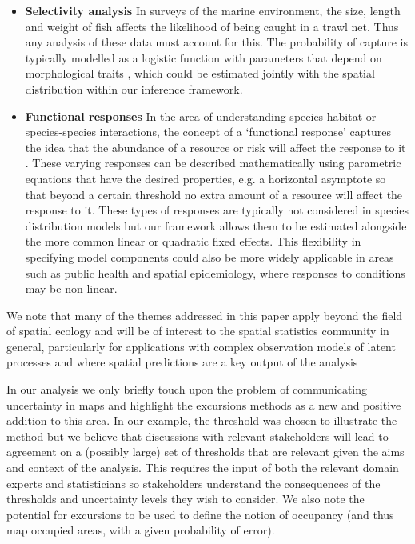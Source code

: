 \documentclass{stylefile16/statsoc}
\begin{document}
\begin{itemize}
	\item \textbf{Selectivity analysis} In surveys of the marine environment, the size, length and weight of fish affects the likelihood of being caught in a trawl net.  Thus any analysis of these data must account for this.  The probability of capture is typically modelled as a logistic function with parameters that depend on morphological traits \citep{herrmann_understanding_2016, madsen_selectivity_2007, galbraith_demersal_1994}, which could be estimated jointly with the spatial distribution within our inference framework.
	\item \textbf{Functional responses} In the area of understanding species-habitat or species-species interactions, the concept of a `functional response' captures the idea that the abundance of a resource or risk will affect the response to it \citep{holling_some_1959}.  These varying responses can be described mathematically using parametric equations that have the desired properties, e.g. a horizontal asymptote so that beyond a certain threshold no extra amount of a resource will affect the response to it.  These types of responses are typically not considered in species distribution models but our framework allows them to be estimated alongside the more common linear or quadratic fixed effects. This flexibility in specifying model components could also be more widely applicable in areas such as public health and spatial epidemiology, where responses to conditions may be non-linear.

\end{itemize}
We note that many of the themes addressed in this paper apply beyond the field of spatial ecology and will be of interest to the spatial statistics community in general, particularly for applications with complex observation models of latent processes and where spatial predictions are a key output of the analysis

In our analysis we only briefly touch upon the problem of communicating uncertainty in maps and highlight the excursions methods as a new and positive addition to this area.  In our example, the threshold was chosen to illustrate the method but we believe that discussions with relevant stakeholders will lead to agreement on a (possibly large) set of thresholds that are relevant given the aims and context of the analysis.  This requires the input of both the relevant domain experts and statisticians so stakeholders understand the consequences of the thresholds and uncertainty levels they wish to consider.  We also note the potential for excursions to be used to define the notion of occupancy (and thus map occupied areas, with a given probability of error).
\end{document}
